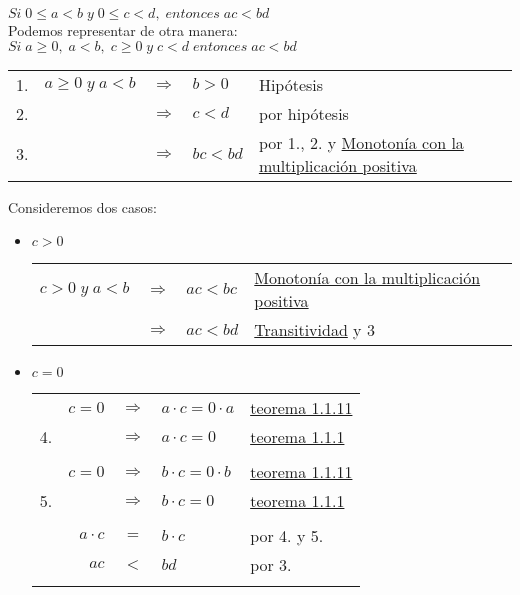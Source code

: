 \begin{teo} 
$Si \; 0 \leq a < b \; y \; 0 \leq c < d, \; entonces \; ac < bd$\\ \label{teo 1.2.6}
Podemos representar de otra manera: $ Si \; a \geq 0, \; a<b, \; c \geq 0 \; y \; c < d \; entonces \; ac < bd$
\begin{center}
\begin{tabular}{c r c l l}
1.&$a \geq 0 \; y \; a < b$&$\Rightarrow$&$b > 0$&Hipótesis\\
2.&&$\Rightarrow$&$c < d$&por hipótesis\\
3.&&$\Rightarrow$&$ bc < bd $&por 1., 2. y \hyperref[O4]{Monotonía con la multiplicación positiva}\\
\end{tabular}
\end{center}
Consideremos dos casos:
\begin{itemize}
\item $c > 0$
\begin{center}
\begin{tabular}{r c l l}
$c>0 \; y \; a < b $&$\Rightarrow$&$ac < bc$&\hyperref[O4]{Monotonía con la multiplicación positiva}\\
&$\Rightarrow$&$ac<bd$&\hyperref[O2]{Transitividad} y 3\\
\end{tabular}
\end{center}
\item $c = 0$
\begin{center}
\begin{tabular}{c r c l l}
&$c = 0$&$\Rightarrow$&$a\cdot c = 0 \cdot a$&\hyperref[teo 1.1.11]{teorema 1.1.11}\\
4.&&$\Rightarrow$&$a \cdot c = 0$&\hyperref[1.1.1]{teorema 1.1.1}\\\\
&$c = 0$&$\Rightarrow$&$b\cdot c = 0 \cdot b$&\hyperref[teo 1.1.11]{teorema 1.1.11}\\
5.&&$\Rightarrow$&$b \cdot c = 0$&\hyperref[teo 1.1.1]{teorema 1.1.1}\\\\
&$a \cdot c$&$=$&$b \cdot c$&por 4. y 5.\\
&$ac$&$<$&$bd$&por 3.\\\\
\end{tabular}
\end{center}
\end{itemize}
\end{teo}



